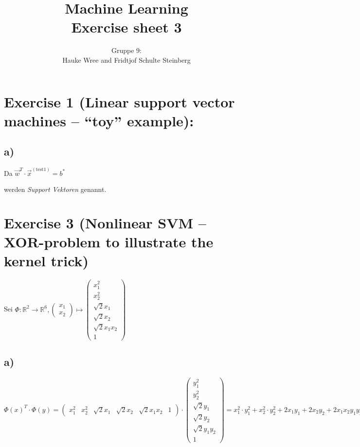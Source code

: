 \documentclass[a4paper,parskip=full-]{article}
\title{Machine Learning \\
Exercise sheet 3}
\author{Gruppe 9: \\Hauke Wree and Fridtjof Schulte Steinberg}
\newcommand{\R}[0]{{\mathbb{R}}}
\begin{document}
\maketitle

\section{Exercise 1 (Linear support vector machines – “toy” example):}

\subsection{a)}

Da $\vec{w}^T \cdot \vec{x}^{(\text{test1})} = b^*$


werden \textit{Support Vektoren} genannt. 
\section{Exercise 3 (Nonlinear SVM – XOR-problem to illustrate the kernel trick)}
Sei 
$\Phi : \R^2 \rightarrow \R^6, \begin{pmatrix} x_1 \\ x_2 \end{pmatrix} \mapsto 
\begin{pmatrix} x_1^2 \\ x_2^2 \\ \sqrt{2} x_1 \\ \sqrt{2} x_2 \\ \sqrt{2} x_1 x_2 \\ 1 \end{pmatrix}$

\subsection{a)}
$$
\Phi(x)^T \cdot \Phi(y) = 
\begin{pmatrix} 
x_1^2 & x_2^2 & \sqrt{2} x_1 & \sqrt{2} x_2 & \sqrt{2} x_1 x_2 & 1 
\end{pmatrix} 
\cdot \begin{pmatrix} y_1^2 \\ y_2^2 \\ \sqrt{2} y_1 \\ \sqrt{2} y_2 \\ \sqrt{2} y_1 y_2 \\ 1 \end{pmatrix}
= x_1^2 \cdot y_1^2 + x_2^2 \cdot y_2^2 + 2 x_1 y_1 + 2 x_2 y_2 + 2 x_1 x_2 y_1 y_2 + 1
$$
\end{document}
